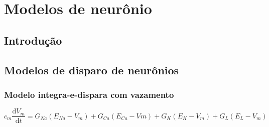 \chapter{Modelos de neurônio}\label{cap:modelos}
\section{Introdução}\label{sec:modelos_intro}

\section{Modelos de disparo de neurônios}\label{sec:modelosdisparo}
\subsection{Modelo integra-e-dispara com vazamento}\label{sec:modelolif}
\cite{lapicque_recherches_1907}

\begin{equation}
c_m\frac{\mathrm{d}V_m}{\mathrm{d}t}=G_{Na}(E_{Na}-V_m)+G_{Ca}(E_{Ca}-Vm)+G_K(E_K-V_m)+G_L(E_L-V_m)
\end{equation}

